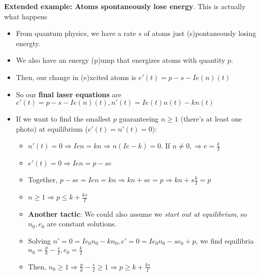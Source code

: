 \documentclass[11pt, oneside]{article}   	%
\begin{document}
\textbf{Extended example: Atoms spontaneously lose energy}.  This is actually what happens
\begin{itemize}
\item From quantum physics, we have a rate $s$ of atoms just (s)pontaneously losing energty.
\item We also have an energy (p)ump that energizes atoms with quantity $p$.
\item Then, our change in (e)xcited atoms is $e'(t) = p -s - Ie(n)(t)$
\item So our \textbf{final laser equations} are $e'(t) = p -s - Ie(n)(t), n'(t) = Ie(t)n(t)-kn(t)$ 
\item If we want to find the smallest $p$ guaranteeing $n \geq 1$ (there's at least one photo) at equilibrium ($e'(t) = n'(t) = 0$):
\begin{itemize}
\item $n'(t) = 0 \Rightarrow Ien = kn \Rightarrow n(Ie-k) = 0$.  If $n \neq 0, \Rightarrow e = \frac{k}{I}$
\item $e'(t) = 0 \Rightarrow Ien = p - se$
\item Together, $p - se = Ien = kn \Rightarrow kn + se = p \Rightarrow kn + s\frac{k}{I} = p$
\item $n \geq 1 \Rightarrow p \leq  k +  \frac{ks}{I}$
\item \textbf{Another tactic}: We could also assume we \emph{start out at equilibrium}, so $n_0, e_0$ are constant solutions.
\item Solving $n' = 0 = Ie_0n_0 - kn_0, e' = 0 = Ie_0n_0 - se_0 + p$, we find equilibria $n_0 = \frac{p}{k} - \frac{s}{I}, e_0 = \frac{k}{I}$
\item Then,  $n_0 \geq 1 \Rightarrow  \frac{p}{k} - \frac{s}{I} \geq 1 \Rightarrow p \geq k + \frac{ks}{I}$
\end{itemize}
\end{itemize}
\end{document}
